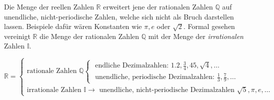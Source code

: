 
Die Menge der reellen Zahlen $\mathbb{R}$ erweitert jene der rationalen Zahlen $\mathbb{Q}$ auf unendliche, nicht-periodische Zahlen, welche sich nicht als Bruch darstellen lassen. Beispiele daf\"{u}r w\"{a}ren Konstanten wie $\pi, e$ oder $\sqrt{2}$. Formal gesehen vereinigt $\mathbb{R}$ die Menge der rationalen Zahlen $\mathbb{Q}$ mit der Menge der \emph{irrationalen} Zahlen $\mathbb{I}$. 

\begin{figure}[h!]
\end{figure}
$$
\mathbb{R} =
\begin{cases}
	\text{rationale Zahlen } \mathbb{Q}
	\begin{cases}
		\text{ endliche Dezimalzahlen: } 1.2, \frac{3}{4}, 45, \sqrt{4}, \ldots
		\\
		\text{ unendliche, periodische Dezimalzahlen: } \frac{1}{3}, \frac{7}{9}, \ldots
	\end{cases}
	\\
	\text{irrationale Zahlen } \mathbb{I} \rightarrow
	\text{ unendliche, nicht-periodische Dezimalzahlen } \sqrt{5}, \pi, e, \ldots
\end{cases}
$$

\pagebreak


